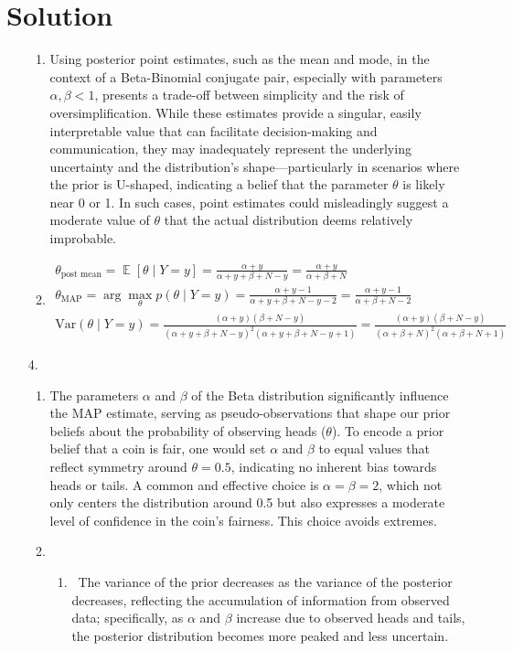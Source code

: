 \documentclass[submit]{harvardml}
\newenvironment{answer}
  {\section*{Solution}}
{}
\DeclareMathOperator*{\mean}{\mathbb{E}}
\begin{document}
\begin{answer}
\begin{enumerate}
      \begin{enumerate}
        \item
Using posterior point estimates, such as the mean and mode, in the context of a Beta-Binomial conjugate pair, especially with parameters \(\alpha, \beta < 1\), presents a trade-off between simplicity and the risk of oversimplification. While these estimates provide a singular, easily interpretable value that can facilitate decision-making and communication, they may inadequately represent the underlying uncertainty and the distribution's shape—particularly in scenarios where the prior is U-shaped, indicating a belief that the parameter \(\theta\) is likely near 0 or 1. In such cases, point estimates could misleadingly suggest a moderate value of \(\theta\) that the actual distribution deems relatively improbable. 
        \item
              \begin{align*}
                \theta_{\text{post mean}} = \mean [\theta \mid Y = y] = \frac{\alpha + y}{\alpha + y + \beta + N - y} = \frac{\alpha + y}{\alpha + \beta + N} &  \\
                \theta_{\text{MAP}} =\arg \max_{\theta}p(\theta \mid Y=y) = \frac{\alpha + y - 1}{\alpha + y + \beta + N - y - 2} = \frac{\alpha + y - 1}{\alpha + \beta + N - 2} &  \\
                \mathrm{Var}(\theta \mid Y = y)                            = \frac{(\alpha + y)(\beta + N - y)}{(\alpha + y + \beta + N - y)^2(\alpha + y + \beta + N - y + 1)} = \frac{(\alpha + y)(\beta + N - y)}{(\alpha + \beta + N)^2(\alpha + \beta + N + 1)}
              \end{align*}

      \end{enumerate}

    \item[4.]

      \begin{enumerate}
        \item
The parameters \(\alpha\) and \(\beta\) of the Beta distribution significantly influence the MAP estimate, serving as pseudo-observations that shape our prior beliefs about the probability of observing heads (\(\theta\)). To encode a prior belief that a coin is fair, one would set \(\alpha\) and \(\beta\) to equal values that reflect symmetry around \(\theta = 0.5\), indicating no inherent bias towards heads or tails. A common and effective choice is \(\alpha = \beta = 2\), which not only centers the distribution around 0.5 but also expresses a moderate level of confidence in the coin's fairness. This choice avoids extremes.
        \item
              \begin{enumerate}
                \item\
The variance of the prior decreases as the variance of the posterior decreases, reflecting the accumulation of information from observed data; specifically, as \(\alpha\) and \(\beta\) increase due to observed heads and tails, the posterior distribution becomes more peaked and less uncertain.


\end{enumerate}
\end{enumerate}
\end{enumerate}
\end{answer}
\end{document}
